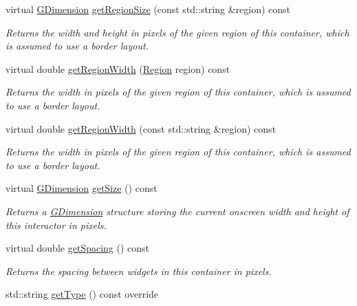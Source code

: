 \begin{DoxyCompactItemize}
virtual \mbox{\hyperlink{structsgl_1_1GDimension}{G\+Dimension}} \mbox{\hyperlink{classsgl_1_1GContainer_a68b18b38b72cb8779fca0c3882549a6b}{get\+Region\+Size}} (const std\+::string \&region) const
\begin{DoxyCompactList}\small\item\em Returns the width and height in pixels of the given region of this container, which is assumed to use a border layout. \end{DoxyCompactList}\item 
virtual double \mbox{\hyperlink{classsgl_1_1GContainer_a96e2005c3f447a8679c3c32d3fc02de1}{get\+Region\+Width}} (\mbox{\hyperlink{classsgl_1_1GContainer_a81a01a86de31071a92e6cce0bab9bc4b}{Region}} region) const
\begin{DoxyCompactList}\small\item\em Returns the width in pixels of the given region of this container, which is assumed to use a border layout. \end{DoxyCompactList}\item 
virtual double \mbox{\hyperlink{classsgl_1_1GContainer_ab169dab454fc90f1c845b91b4e1a8a14}{get\+Region\+Width}} (const std\+::string \&region) const
\begin{DoxyCompactList}\small\item\em Returns the width in pixels of the given region of this container, which is assumed to use a border layout. \end{DoxyCompactList}\item 
virtual \mbox{\hyperlink{structsgl_1_1GDimension}{G\+Dimension}} \mbox{\hyperlink{classsgl_1_1GInteractor_a7b4eec96a2bdc6420695d5796a78eea9}{get\+Size}} () const
\begin{DoxyCompactList}\small\item\em Returns a \mbox{\hyperlink{structsgl_1_1GDimension}{G\+Dimension}} structure storing the current onscreen width and height of this interactor in pixels. \end{DoxyCompactList}\item 
virtual double \mbox{\hyperlink{classsgl_1_1GContainer_a9a7e859eeff5cc7de46d65b9be7afc3c}{get\+Spacing}} () const
\begin{DoxyCompactList}\small\item\em Returns the spacing between widgets in this container in pixels. \end{DoxyCompactList}\item 
std\+::string \mbox{\hyperlink{classsgl_1_1GContainer_a9b72ede4ee8520f987a0c01e30654814}{get\+Type}} () const override

\end{DoxyCompactItemize}
